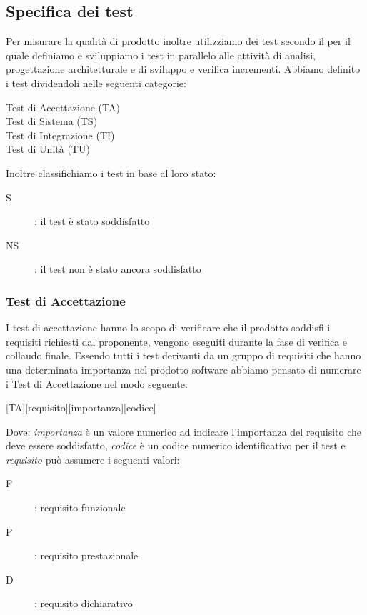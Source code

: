 \documentclass[../piano-di-qualifica.tex]{subfiles}
\begin{document}
\subsection{Specifica dei test}%
\label{sub:test}
Per misurare la qualità di prodotto inoltre utilizziamo dei test secondo il  per il quale definiamo e sviluppiamo i test in parallelo alle attività di analisi, progettazione architetturale e di sviluppo e verifica incrementi.
Abbiamo definito i test dividendoli nelle seguenti categorie:
\begin{description}
  \item [Test di Accettazione (TA)]
  \item [Test di Sistema (TS)]
  \item [Test di Integrazione (TI)]
  \item [Test di Unità (TU)]
\end{description}
Inoltre classifichiamo i test in base al loro stato:
\begin{description}
  \item [S]: il test è stato soddisfatto
  \item [NS]: il test non è stato ancora soddisfatto
\end{description}
\subsubsection{Test di Accettazione}%
\label{subs:accettazione}
I test di accettazione hanno lo scopo di verificare che il prodotto soddisfi i requisiti richiesti dal proponente, vengono eseguiti durante la fase di verifica e collaudo finale.
Essendo tutti i test derivanti da un gruppo di requisiti che hanno una determinata importanza nel prodotto software abbiamo pensato di numerare i Test di Accettazione nel modo seguente:
\begin{center}
  [TA][requisito][importanza][codice]
\end{center}
Dove: \textit{importanza} è un valore numerico ad indicare l'importanza del requisito che deve essere soddisfatto, \textit{codice} è un codice numerico identificativo per il test e \textit{requisito} può assumere i seguenti valori:
\begin{description}
  \item [F]: requisito funzionale
  \item [P]: requisito prestazionale
  \item [D]: requisito dichiarativo
\end{description}
\end{document}
